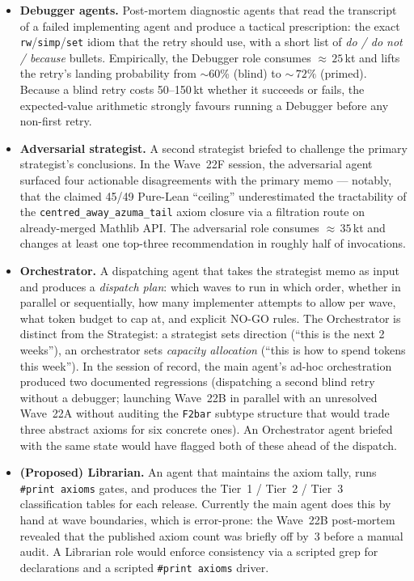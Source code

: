 \documentclass[11pt,a4paper]{article}
\newcommand{\cmd}[1]{\texttt{\small #1}}
\theoremstyle{plain}
\theoremstyle{definition}
\begin{document}
\begin{itemize}[leftmargin=1.3em]
  \item \textbf{Debugger agents.} Post-mortem diagnostic agents that
        read the transcript of a failed implementing agent and produce
        a tactical prescription: the exact \cmd{rw}/\cmd{simp}/\cmd{set}
        idiom that the retry should use, with a short list of
        \emph{do / do not / because} bullets. Empirically, the Debugger
        role consumes ${\approx}\,25$\,kt and lifts the retry's landing
        probability from $\sim$60\% (blind) to ${\sim}\,72\%$ (primed).
        Because a blind retry costs 50--150\,kt whether it succeeds or
        fails, the expected-value arithmetic strongly favours running a
        Debugger before any non-first retry.
  \item \textbf{Adversarial strategist.} A second strategist briefed to
        challenge the primary strategist's conclusions. In the Wave~22F
        session, the adversarial agent surfaced four actionable
        disagreements with the primary memo --- notably, that the
        claimed 45/49 Pure-Lean ``ceiling'' underestimated the
        tractability of the \cmd{centred\_away\_azuma\_tail} axiom
        closure via a filtration route on already-merged Mathlib API.
        The adversarial role consumes ${\approx}\,35$\,kt and changes
        at least one top-three recommendation in roughly half of
        invocations.
  \item \textbf{Orchestrator.} A dispatching agent that takes the
        strategist memo as input and produces a \emph{dispatch plan}:
        which waves to run in which order, whether in parallel or
        sequentially, how many implementer attempts to allow per wave,
        what token budget to cap at, and explicit NO-GO rules. The
        Orchestrator is distinct from the Strategist: a strategist sets
        direction (``this is the next 2 weeks''), an orchestrator sets
        \emph{capacity allocation} (``this is how to spend tokens this
        week''). In the session of record, the main agent's ad-hoc
        orchestration produced two documented regressions (dispatching
        a second blind retry without a debugger; launching
        Wave~22B in parallel with an unresolved Wave~22A without
        auditing the \cmd{F2bar} subtype structure that would trade
        three abstract axioms for six concrete ones). An Orchestrator
        agent briefed with the same state would have flagged both of
        these ahead of the dispatch.
  \item \textbf{(Proposed) Librarian.} An agent that maintains the
        axiom tally, runs \cmd{\#print axioms} gates, and produces the
        Tier~1 / Tier~2 / Tier~3 classification tables for each
        release. Currently the main agent does this by hand at wave
        boundaries, which is error-prone: the Wave~22B post-mortem
        revealed that the published axiom count was briefly off by~3
        before a manual audit. A Librarian role would enforce
        consistency via a scripted grep for  declarations and a scripted
        \cmd{\#print axioms} driver.
\end{itemize}
\end{document}
